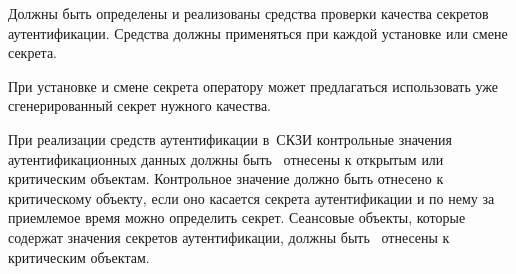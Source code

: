\label{R.IA.PwdSet}
Должны быть определены и реализованы средства проверки качества секретов
аутентификации. Средства должны применяться при каждой установке или смене
секрета.

\begin{note}
При установке и смене секрета оператору может предлагаться использовать
уже сгенерированный секрет нужного качества.
\end{note}

\label{R.IA.AuthProtect}
При реализации средств аутентификации в~СКЗИ контрольные значения
аутентификационных данных должны быть~ отнесены к открытым
или критическим объектам.
%
Контрольное значение должно быть отнесено к критическому объекту, 
если оно касается секрета аутентификации и по нему за приемлемое
время можно определить секрет.
%
Сеансовые объекты, которые содержат значения секретов аутентификации,
должны быть~ отнесены к критическим объектам.


